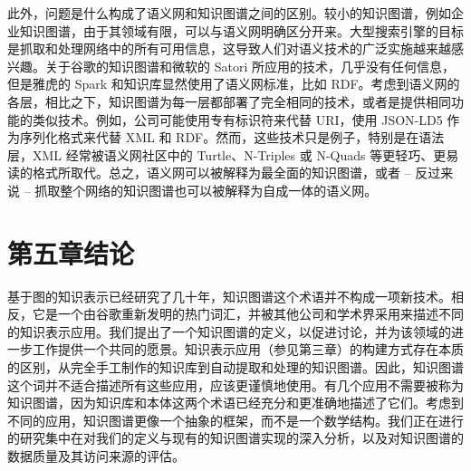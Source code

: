 \documentclass[a4paper,AutoFakeBold,oneside,12pt]{book}
\begin{document}
\begin{nopagenumber}
	此外，问题是什么构成了语义网和知识图谱之间的区别。较小的知识图谱，例如企业知识图谱，由于其领域有限，可以与语义网明确区分开来。大型搜索引擎的目标是抓取和处理网络中的所有可用信息，这导致人们对语义技术的广泛实施越来越感兴趣。关于谷歌的知识图谱和微软的 Satori 所应用的技术，几乎没有任何信息，但是雅虎的 Spark 和知识库显然使用了语义网标准，比如 RDF。考虑到语义网的各层，相比之下，知识图谱为每一层都部署了完全相同的技术，或者是提供相同功能的类似技术。例如，公司可能使用专有标识符来代替 URI，使用 JSON-LD5 作为序列化格式来代替 XML 和 RDF。然而，这些技术只是例子，特别是在语法层，XML 经常被语义网社区中的 Turtle、N-Triples 或 N-Quads 等更轻巧、更易读的格式所取代。总之，语义网可以被解释为最全面的知识图谱，或者 -- 反过来说 -- 抓取整个网络的知识图谱也可以被解释为自成一体的语义网。

	\newpage
	\chapter*{第五章\quad{}结论}
	\newtranschapter

	基于图的知识表示已经研究了几十年，知识图谱这个术语并不构成一项新技术。相反，它是一个由谷歌重新发明的热门词汇，并被其他公司和学术界采用来描述不同的知识表示应用。我们提出了一个知识图谱的定义，以促进讨论，并为该领域的进一步工作提供一个共同的愿景。知识表示应用（参见第三章）的构建方式存在本质的区别，从完全手工制作的知识库到自动提取和处理的知识图谱。因此，知识图谱这个词并不适合描述所有这些应用，应该更谨慎地使用。有几个应用不需要被称为知识图谱，因为知识库和本体这两个术语已经充分和更准确地描述了它们。考虑到不同的应用，知识图谱更像一个抽象的框架，而不是一个数学结构。我们正在进行的研究集中在对我们的定义与现有的知识图谱实现的深入分析，以及对知识图谱的数据质量及其访问来源的评估。

	\endgroup

\end{nopagenumber}

\blankmatter



\blankmatter


\blankmatter

\end{document}
